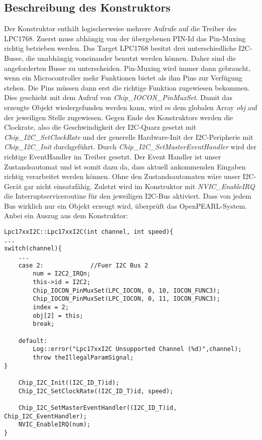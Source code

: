 \subsection{Beschreibung des Konstruktors}
Der Konstruktor enthält logischerweise mehrere Aufrufe auf die Treiber des LPC1768. Zuerst muss abhängig von der übergebenen PIN-Id das Pin-Muxing richtig betrieben werden. Das Target LPC1768 besitzt drei unterschiedliche I2C-Busse, die unabhängig voneinander benutzt werden können. Daher sind die angeforderten Busse zu unterscheiden. Pin-Muxing wird immer dann gebraucht, wenn ein Microcontroller mehr Funktionen bietet als ihm Pins zur Verfügung stehen. Die Pins müssen dann erst die richtige Funktion zugewiesen bekommen. Dies geschieht mit dem Aufruf von {\textit{Chip\_IOCON\_PinMuxSet}}. Damit das erzeugte Objekt wiedergefunden werden kann, wird es dem globalen Array {\textit{obj}} auf der jeweiligen Stelle zugewiesen. Gegen Ende des Konstruktors werden die Clockrate, also die Geschwindigkeit der I2C-Quarz gesetzt mit {\textit{Chip\_I2C\_SetClockRate}} und der generelle Hardware-Init der I2C-Peripherie mit {\textit{Chip\_I2C\_Init}} durchgeführt. Durch {\textit{Chip\_I2C\_SetMasterEventHandler}} wird der richtige EventHandler im Treiber gesetzt. Der Event Handler ist unser Zustandsautomat und ist somit dazu da, dass aktuell ankommenden Eingaben richtig verarbeitet werden können. Ohne den Zustandsautomaten wäre unser I2C-Gerät gar nicht einsatzfähig. Zuletzt wird im Konstruktor mit {\textit{NVIC\_EnableIRQ}} die Interruptserviceroutine für den jeweiligen I2C-Bus aktiviert. Dass von jedem Bus wirklich nur ein Objekt erzeugt wird, überprüft das OpenPEARL-System. Anbei ein Auszug aus dem Konstruktor:
\begin{lstlisting}
Lpc17xxI2C::Lpc17xxI2C(int channel, int speed){
...
switch(channel){
	...
	case 2:				//Fuer I2C Bus 2
		num = I2C2_IRQn;
		this->id = I2C2;
		Chip_IOCON_PinMuxSet(LPC_IOCON, 0, 10, IOCON_FUNC3);
		Chip_IOCON_PinMuxSet(LPC_IOCON, 0, 11, IOCON_FUNC3);
		index = 2;
		obj[2] = this;
		break;

	default:
		Log::error("Lpc17xxI2C Unsupported Channel (%d)",channel);
		throw theIllegalParamSignal;
}

	Chip_I2C_Init((I2C_ID_T)id);
	Chip_I2C_SetClockRate((I2C_ID_T)id, speed);

	Chip_I2C_SetMasterEventHandler((I2C_ID_T)id, Chip_I2C_EventHandler);
	NVIC_EnableIRQ(num);
}
\end{lstlisting}

